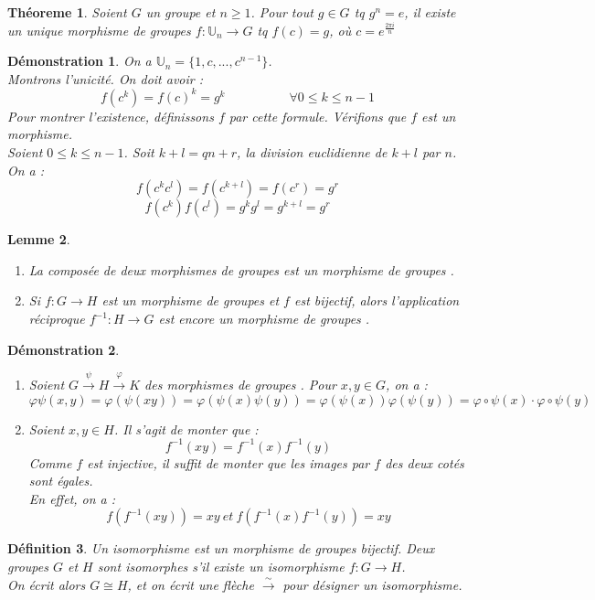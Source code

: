 \documentclass[a4paper, oneside]{report}
\theoremstyle{break}
\newtheorem{thm}{Théoreme}[section] %
\newtheorem{defi}[thm]{Définition}
\newtheorem{lemme}[thm]{Lemme}
\newtheorem*{demo}{Démonstration}
\newcommand{\U}{\mathbb{U}}
\newcommand{\mdg}{morphisme de groupes }
\newcommand{\mdgs}{morphismes de groupes }
\newcommand{\fong}{\overset{\sim}{\rightarrow}}
\begin{document}
\begin{thm}
	Soient $G$ un groupe et $n\geq 1$. Pour tout $g\in G$ tq $g^n=e$, il existe un unique \mdg $f:\U_n \rightarrow G$ tq $f(c)=g$, où $c=e^{\frac{2\pi i}{n}}$
\end{thm}

\begin{demo}
	On a $\U_n = \{1,c,...,c^{n-1}\}$.\\
	Montrons l'unicité. On doit avoir :
	$$f(c^k)=f(c)^k=g^k\hspace{5em}\forall 0\leq k \leq n-1$$
	Pour montrer l'existence, définissons $f$ par cette formule. Vérifions que $f$ est un morphisme.\\
	Soient $0\leq k\leq n-1$. Soit $k+l=qn+r$, la division euclidienne de $k+l$ par $n$. On a :
	$$f(c^kc^l)= f(c^{k+l})=f(c^r)=g^r$$
	$$f(c^k)f(c^l)=g^kg^l=g^{k+l}=g^r$$
\end{demo}

\begin{lemme}
	\begin{enumerate}
		\item La composée de deux \mdgs est un \mdg.
		\item Si $f:G\rightarrow H$ est un \mdg et $f$ est bijectif, alors l'application réciproque $f^{-1}:H\rightarrow G$ est encore un \mdg.
	\end{enumerate}
\end{lemme}

\begin{demo}
	\begin{enumerate}
		\item Soient $G\overset{\psi}{\rightarrow} H \overset{\varphi}{\rightarrow} K$ des \mdgs. Pour $x,y\in G$, on a :
		$$\varphi\psi (x,y)=\varphi (\psi (xy))=\varphi (\psi(x)\psi(y)) = \varphi(\psi (x))\varphi(\psi(y))=\varphi\circ \psi(x)\cdot \varphi \circ \psi(y)$$
		\item Soient $x,y\in H$. Il s'agit de monter que :
		$$f^{-1}(xy)=f^{-1}(x)f^{-1}(y)$$
		Comme $f$ est injective, il suffit de monter que les images par $f$ des deux cotés sont égales.\\
		En effet, on a :
		$$f(f^{-1}(xy))=xy~et~f(f^{-1}(x)f^{-1}(y))=xy$$
	\end{enumerate}
\end{demo}

\begin{defi}
	Un isomorphisme est un \mdg bijectif. Deux groupes $G$ et $H$ sont isomorphes s'il existe un isomorphisme $f:G\rightarrow H$.\\
	On écrit alors $G\cong H$, et on écrit une flèche $\fong$ pour désigner un isomorphisme.
\end{defi}
\end{document}
